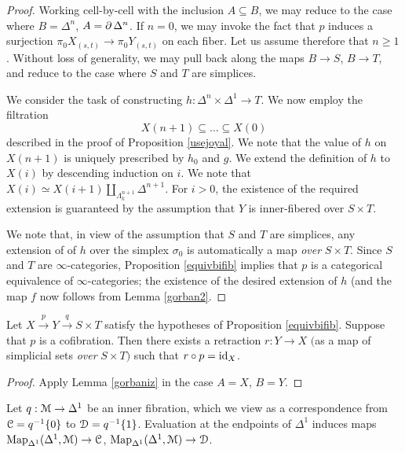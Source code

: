 \begin{proof}
Working cell-by-cell with the inclusion $A \subseteq B$, we may reduce to the case where $B = \Delta^n$, $A = \operatorname{\partial} \Delta^n$. If $n = 0$, we may invoke the fact that $p$ induces a surjection
$\pi_0 X_{(s,t)} \rightarrow \pi_0 Y_{(s,t)}$ on each fiber. Let us assume therefore that $n \geq 1$.
Without loss of generality, we may pull back along the maps $B \rightarrow S$, $B \rightarrow T$, and reduce to the case where $S$ and $T$ are simplices.

We consider the task of constructing $h: \Delta^n \times \Delta^1 \rightarrow T$. We 
now employ the filtration
$$ X(n+1) \subseteq \ldots \subseteq X(0) $$
described in the proof of Proposition \ref{usejoyal}. We note that the value of $h$ on $X(n+1)$ is uniquely prescribed by $h_0$ and $g$. We extend the definition of $h$ to $X(i)$ by descending induction on $i$. We note that $X(i) \simeq X(i+1) \coprod_{ \Lambda^{n+1}_k} \Delta^{n+1}$. For $i > 0$, the existence of the required extension is guaranteed by the assumption that $Y$ is inner-fibered over $S \times T$.

We note that, in view of the assumption that $S$ and $T$ are simplices, any extension of of $h$ over the simplex $\sigma_0$ is automatically a map {\em over} $S \times T$. Since $S$ and $T$ are $\infty$-categories, Proposition \ref{equivbifib} implies that $p$ is a categorical equivalence of $\infty$-categories; the existence of the desired extension of $h$ (and the map $f$ now follows from Lemma \ref{gorban2}.
\end{proof}

\begin{proposition}\label{lemba}
Let $X \stackrel{p}{\rightarrow} Y \stackrel{q}{\rightarrow} S \times T$ satisfy the hypotheses of Proposition \ref{equivbifib}. Suppose that $p$ is a cofibration. Then there exists a retraction $r: Y \rightarrow X$ $($as a map of simplicial sets {\em over} $S \times T${}$)$ such that $r \circ p = \operatorname{id}_X$.
\end{proposition}

\begin{proof}
Apply Lemma \ref{gorbaniz} in the case $A = X$, $B = Y$.
\end{proof}

Let $q: \operatorname{\mathcal{M}} \rightarrow \Delta^1$ be an inner fibration, which we view as a correspondence from
$\operatorname{\mathcal{C}} = q^{-1} \{0\}$ to $\operatorname{\mathcal{D}} = q^{-1} \{1\}$. Evaluation at the endpoints of
$\Delta^1$ induces maps $\operatorname{{Map}}_{\Delta^1}(\Delta^1, \operatorname{\mathcal{M}}) \rightarrow \operatorname{\mathcal{C}}$, $\operatorname{{Map}}_{\Delta^1}(\Delta^1,\operatorname{\mathcal{M}}) \rightarrow \operatorname{\mathcal{D}}$.

